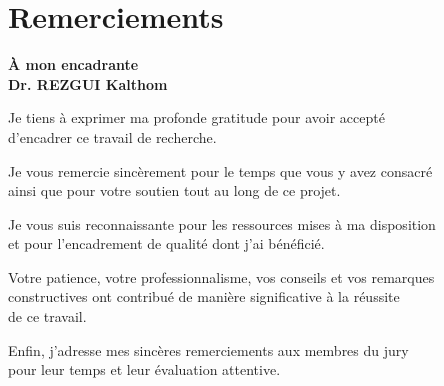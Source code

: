 \chapter*{\textbf{Remerciements}}
\thispagestyle{plain}
\singlespacing

\vspace*{1.2cm}

\begin{center}
\textbf{ À mon encadrante}\\[0.35cm]
\textbf{Dr. REZGUI Kalthom}
\end{center}

\vspace{1.4cm}

\begin{center}
Je tiens à exprimer ma profonde gratitude pour avoir accepté\\
d'encadrer ce travail de recherche.
\end{center}

\vspace{0.85cm}

\begin{center}
Je vous remercie sincèrement pour le temps que vous y avez consacré\\
ainsi que pour votre soutien tout au long de ce projet.
\end{center}

\vspace{0.85cm}

\begin{center}
Je vous suis reconnaissante pour les ressources mises à ma disposition\\
et pour l'encadrement de qualité dont j'ai bénéficié.
\end{center}

\vspace{0.85cm}

\begin{center}
Votre patience, votre professionnalisme, vos conseils et vos remarques\\
constructives ont contribué de manière significative à la réussite\\
de ce travail.
\end{center}

\vspace{0.85cm}

\begin{center}
Enfin, j'adresse mes sincères remerciements aux membres du jury\\
pour leur temps et leur évaluation attentive.
\end{center}

\onehalfspacing
